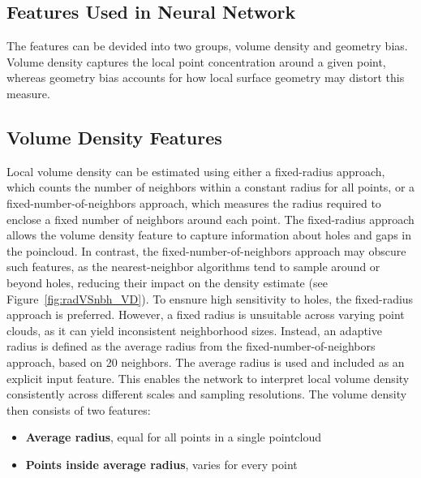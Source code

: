 \subsection{Features Used in Neural Network}
\label{sec:features}
The features can be devided into two groups, volume density and geometry bias. Volume density captures the local point concentration around a given point, whereas geometry bias accounts for how local surface geometry may distort this measure.

\subsection*{Volume Density Features}
Local volume density can be estimated using either a fixed-radius approach, which counts the number of neighbors within a constant radius for all points, or a fixed-number-of-neighbors approach, which measures the radius required to enclose a fixed number of neighbors around each point. The fixed-radius approach allows the volume density feature to capture information about holes and gaps in the poincloud. In contrast, the fixed-number-of-neighbors approach may obscure such features, as the nearest-neighbor algorithms tend to sample around or beyond holes, reducing their impact on the density estimate (see Figure~\ref{fig:radVSnbh_VD}). 
To ensnure high sensitivity to holes, the fixed-radius approach is preferred. However, a fixed radius is unsuitable across varying point clouds, as it can yield inconsistent neighborhood sizes. Instead, an adaptive radius is defined as the average radius from the fixed-number-of-neighbors approach, based on 20 neighbors. The average radius is used and included as an explicit input feature. This enables the network to interpret local volume density consistently across different scales and sampling resolutions.
The volume density then consists of two features:
\begin{itemize}
    \item \textbf{Average radius}, equal for all points in a single pointcloud 
    \item \textbf{Points inside average radius}, varies for every point
\end{itemize}

